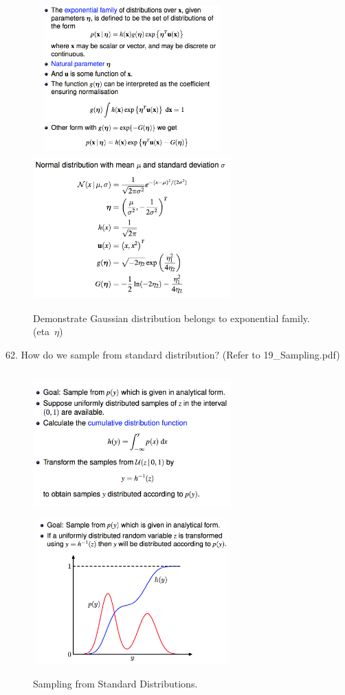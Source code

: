 \documentclass[11pt,a4paper]{article}
\begin{document}
\begin{figure}[H] \centering
    \includegraphics[width=3in,height=2.2in]{./figure/expfamily_1.png}
    \includegraphics[width=3in,height=2.2in]{./figure/expfamily_2.png}
    \caption{Demonstrate Gaussian distribution belongs to exponential family. (eta\ $\eta$)}
\end{figure}

62. How do we sample from standard distribution? (Refer to 19\_Sampling.pdf)
    \begin{figure}[H] \centering
    \includegraphics[width=3in,height=2.2in]{./figure/standardSampling_1.png}
    \includegraphics[width=3in,height=2.2in]{./figure/standardSampling_2.png}
    \caption{Sampling from Standard Distributions.}
\end{figure}
\end{document}
